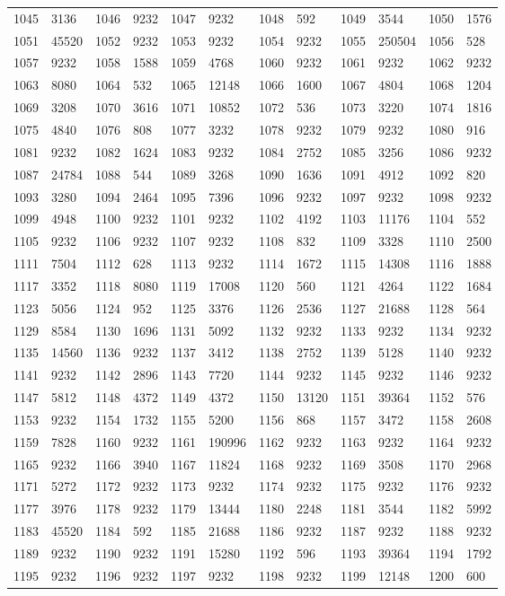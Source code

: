 \begin{longtable}{llllllllllll}
1045 & 3136&1046 &9232&1047& 9232&1048 &592&1049 &3544&1050& 1576\\
1051 & 45520&1052 &9232&1053& 9232&1054 &9232&1055 &250504&1056& 528\\
1057 & 9232&1058 &1588&1059& 4768&1060 &9232&1061 &9232&1062& 9232\\
1063 & 8080&1064 &532&1065& 12148&1066 &1600&1067 &4804&1068& 1204\\
1069 & 3208&1070 &3616&1071& 10852&1072 &536&1073 &3220&1074& 1816\\
1075 & 4840&1076 &808&1077& 3232&1078 &9232&1079 &9232&1080& 916\\
1081 & 9232&1082 &1624&1083& 9232&1084 &2752&1085 &3256&1086& 9232\\
1087 & 24784&1088 &544&1089& 3268&1090 &1636&1091 &4912&1092& 820\\
1093 & 3280&1094 &2464&1095& 7396&1096 &9232&1097 &9232&1098& 9232\\
1099 & 4948&1100 &9232&1101& 9232&1102 &4192&1103 &11176&1104& 552\\
1105 & 9232&1106 &9232&1107& 9232&1108 &832&1109 &3328&1110& 2500\\
1111 & 7504&1112 &628&1113& 9232&1114 &1672&1115 &14308&1116& 1888\\
1117 & 3352&1118 &8080&1119& 17008&1120 &560&1121 &4264&1122& 1684\\
1123 & 5056&1124 &952&1125& 3376&1126 &2536&1127 &21688&1128& 564\\
1129 & 8584&1130 &1696&1131& 5092&1132 &9232&1133 &9232&1134& 9232\\
1135 & 14560&1136 &9232&1137& 3412&1138 &2752&1139 &5128&1140& 9232\\
1141 & 9232&1142 &2896&1143& 7720&1144 &9232&1145 &9232&1146& 9232\\
1147 & 5812&1148 &4372&1149& 4372&1150 &13120&1151 &39364&1152& 576\\
1153 & 9232&1154 &1732&1155& 5200&1156 &868&1157 &3472&1158& 2608\\
1159 & 7828&1160 &9232&1161& 190996&1162 &9232&1163 &9232&1164& 9232\\
1165 & 9232&1166 &3940&1167& 11824&1168 &9232&1169 &3508&1170& 2968\\
1171 & 5272&1172 &9232&1173& 9232&1174 &9232&1175 &9232&1176& 9232\\
1177 & 3976&1178 &9232&1179& 13444&1180 &2248&1181 &3544&1182& 5992\\
1183 & 45520&1184 &592&1185& 21688&1186 &9232&1187 &9232&1188& 9232\\
1189 & 9232&1190 &9232&1191& 15280&1192 &596&1193 &39364&1194& 1792\\
1195 & 9232&1196 &9232&1197& 9232&1198 &9232&1199 &12148&1200& 600\\
\bottomrule\end{longtable}
